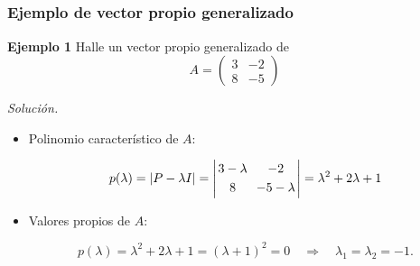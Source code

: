 
\subsection{}

\begin{frame}\frametitle{Ejemplo de vector propio generalizado}

\begin{ej}{\textbf{Ejemplo 1}} \justifying
	Halle un vector propio generalizado de
	\[
	A = 
	\left(
	\begin{array}{cc}
	3 & -2 \\[1mm]
	8 & -5
	\end{array}
	\right)
	\]
\end{ej}

\textit{Solución.}

\vspace{2mm}
\begin{itemize}
	\item Polinomio característico de $A$:
	
	\vspace{2mm}	
	\[
		p(\lambda) = |P-\lambda I| =
		\left|	
		\begin{array}{@{\hspace{0.2\tabcolsep}}c@{\hspace{1.2\tabcolsep}}c@{\hspace{0.2\tabcolsep}}}
		3-\lambda & -2 \\[1mm]
		8 & -5-\lambda
		\end{array}
		\right| 
		=
		\lambda^2 +2\lambda + 1
	\]
	
	\vspace{5mm}	
	\item Valores propios de $A$:
	
	\vspace{0mm}
	\[
	p(\lambda)  = \lambda^2 +2\lambda + 1 = (\lambda+1)^2=0
	\quad \Longrightarrow \quad 
	\lambda_1=\lambda_2=-1.
	\]
	
\end{itemize}

\end{frame}


\subsection{}

